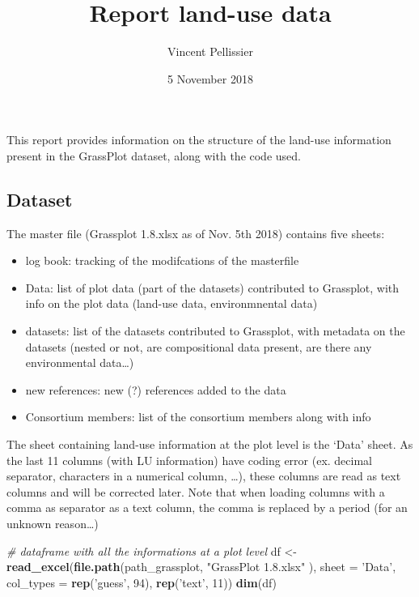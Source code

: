 \documentclass[table]{article}
\title{Report land-use data}
\author{Vincent Pellissier}
\date{5 November 2018}
\newenvironment{Shaded}{\begin{snugshade}}{\end{snugshade}}
\newcommand{\KeywordTok}[1]{\textcolor[rgb]{0.13,0.29,0.53}{\textbf{#1}}}
\newcommand{\DataTypeTok}[1]{\textcolor[rgb]{0.13,0.29,0.53}{#1}}
\newcommand{\DecValTok}[1]{\textcolor[rgb]{0.00,0.00,0.81}{#1}}
\newcommand{\StringTok}[1]{\textcolor[rgb]{0.31,0.60,0.02}{#1}}
\newcommand{\CommentTok}[1]{\textcolor[rgb]{0.56,0.35,0.01}{\textit{#1}}}
\newcommand{\NormalTok}[1]{#1}
\providecommand{\tightlist}{%
  \setlength{\itemsep}{0pt}\setlength{\parskip}{0pt}}
\begin{document}
\maketitle

This report provides information on the structure of the land-use
information present in the GrassPlot dataset, along with the code used.

\subsection{Dataset}\label{dataset}

The master file (Grassplot 1.8.xlsx as of Nov. 5th 2018) contains five
sheets:

\begin{itemize}
\tightlist
\item
  log book: tracking of the modifcations of the masterfile
\item
  Data: list of plot data (part of the datasets) contributed to
  Grassplot, with info on the plot data (land-use data, environmnental
  data)
\item
  datasets: list of the datasets contributed to Grassplot, with metadata
  on the datasets (nested or not, are compositional data present, are
  there any environmental data\ldots{})
\item
  new references: new (?) references added to the data
\item
  Consortium members: list of the consortium members along with info
\end{itemize}

The sheet containing land-use information at the plot level is the
`Data' sheet. As the last 11 columns (with LU information) have coding
error (ex. decimal separator, characters in a numerical column,
\ldots{}), these columns are read as text columns and will be corrected
later. Note that when loading columns with a comma as separator as a
text column, the comma is replaced by a period (for an unknown
reason\ldots{})

\begin{Shaded}
\begin{Highlighting}[]
\CommentTok{# dataframe with all the informations at a plot level}
\NormalTok{df <-}\StringTok{ }\KeywordTok{read_excel}\NormalTok{(}\KeywordTok{file.path}\NormalTok{(path_grassplot, }\StringTok{"GrassPlot 1.8.xlsx"}\NormalTok{ ),}
                 \DataTypeTok{sheet =} \StringTok{'Data'}\NormalTok{, }
                 \DataTypeTok{col_types =} \KeywordTok{rep}\NormalTok{(}\StringTok{'guess'}\NormalTok{, }\DecValTok{94}\NormalTok{), }\KeywordTok{rep}\NormalTok{(}\StringTok{'text'}\NormalTok{, }\DecValTok{11}\NormalTok{))}
\KeywordTok{dim}\NormalTok{(df)}
\end{Highlighting}
\end{Shaded}
\end{document}
